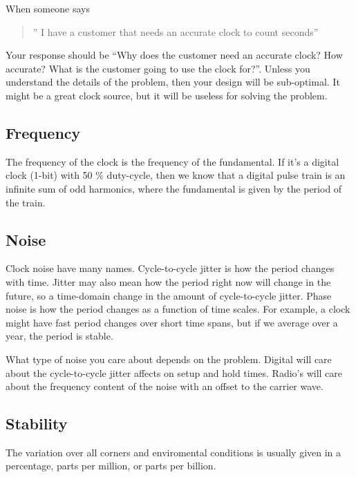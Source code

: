 When someone says

\begin{quote}
'' I have a customer that needs an accurate clock to count seconds''
\end{quote}

Your response should be ``Why does the customer need an accurate clock?
How accurate? What is the customer going to use the clock for?''. Unless
you understand the details of the problem, then your design will be
sub-optimal. It might be a great clock source, but it will be useless
for solving the problem.

\subsection{Frequency}\label{frequency}

The frequency of the clock is the frequency of the fundamental. If it's
a digital clock (1-bit) with 50 \% duty-cycle, then we know that a
digital pulse train is an infinite sum of odd harmonics, where the
fundamental is given by the period of the train.

\subsection{Noise}\label{noise}

Clock noise have many names. Cycle-to-cycle jitter is how the period
changes with time. Jitter may also mean how the period right now will
change in the future, so a time-domain change in the amount of
cycle-to-cycle jitter. Phase noise is how the period changes as a
function of time scales. For example, a clock might have fast period
changes over short time spans, but if we average over a year, the period
is stable.

What type of noise you care about depends on the problem. Digital will
care about the cycle-to-cycle jitter affects on setup and hold times.
Radio's will care about the frequency content of the noise with an
offset to the carrier wave.

\subsection{Stability}\label{stability}

The variation over all corners and enviromental conditions is usually
given in a percentage, parts per million, or parts per billion.

